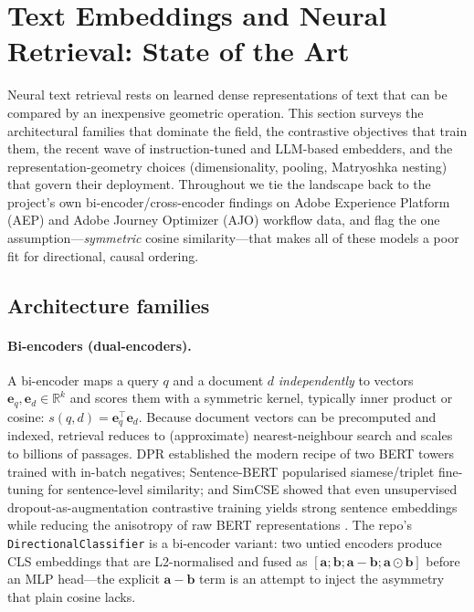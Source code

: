 \section{Text Embeddings and Neural Retrieval: State of the Art}
\label{sec:embeddings}

Neural text retrieval rests on learned dense representations of text that can be
compared by an inexpensive geometric operation. This section surveys the
architectural families that dominate the field, the contrastive objectives that
train them, the recent wave of instruction-tuned and LLM-based embedders, and the
representation-geometry choices (dimensionality, pooling, Matryoshka nesting) that
govern their deployment. Throughout we tie the landscape back to the project's own
bi-encoder/cross-encoder findings on Adobe Experience Platform (AEP) and Adobe
Journey Optimizer (AJO) workflow data, and flag the one assumption---\emph{symmetric}
cosine similarity---that makes all of these models a poor fit for directional, causal
ordering.

\subsection{Architecture families}
\label{sec:emb:arch}

\paragraph{Bi-encoders (dual-encoders).}
A bi-encoder maps a query $q$ and a document $d$ \emph{independently} to vectors
$\mathbf{e}_q,\mathbf{e}_d\in\mathbb{R}^k$ and scores them with a symmetric kernel,
typically inner product or cosine: $s(q,d)=\mathbf{e}_q^{\!\top}\mathbf{e}_d$. Because
document vectors can be precomputed and indexed, retrieval reduces to (approximate)
nearest-neighbour search and scales to billions of passages. DPR
\citep{emb:karpukhin2020dpr} established the modern recipe of two BERT towers trained
with in-batch negatives; Sentence-BERT \citep{emb:reimers2019sbert} popularised
siamese/triplet fine-tuning for sentence-level similarity; and SimCSE
\citep{emb:gao2021simcse} showed that even unsupervised dropout-as-augmentation
contrastive training yields strong sentence embeddings while reducing the
anisotropy of raw BERT representations \citep{emb:li2020sentencebias}. The repo's
\texttt{DirectionalClassifier} is a bi-encoder variant: two untied encoders produce
CLS embeddings that are L2-normalised and fused as $[\mathbf{a};\mathbf{b};
\mathbf{a}{-}\mathbf{b};\mathbf{a}{\odot}\mathbf{b}]$ before an MLP head---the
explicit $\mathbf{a}{-}\mathbf{b}$ term is an attempt to inject the asymmetry that
plain cosine lacks.

